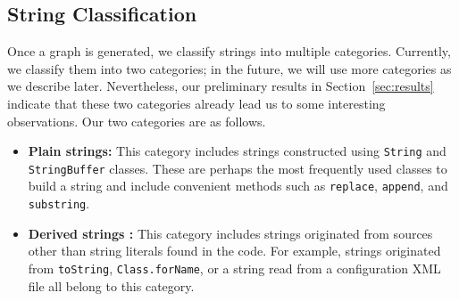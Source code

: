 \subsection{String Classification}

Once a graph is generated, we classify strings into multiple categories.
Currently, we classify them into two categories; in the future, we will use
more categories as we describe later. Nevertheless, our preliminary results in
Section~\ref{sec:results} indicate that these two categories already lead us to
some interesting observations. Our two categories are as follows.

\begin{itemize}
\item \textbf{Plain strings:} This category includes strings constructed using
\texttt{String} and \texttt{StringBuffer} classes. These are perhaps the most
frequently used classes to build a string and include convenient methods such as
\texttt{replace}, \texttt{append}, and \texttt{substring}. 
\item \textbf{Derived strings :} This category includes
strings originated from sources other than string literals found in the code.
For example, strings originated from \texttt{toString},
\texttt{Class.forName}, or a string read from a configuration XML file all
belong to this category.
\end{itemize}

